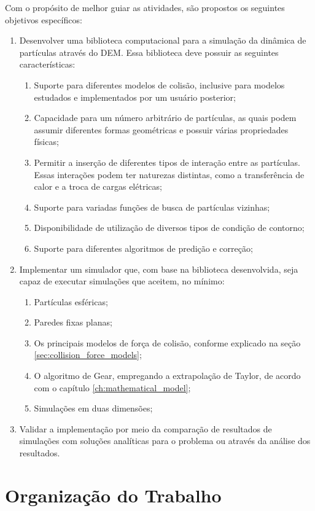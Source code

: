 Com o propósito de melhor guiar as atividades, são propostos os seguintes objetivos específicos:
\begin{enumerate}
\item Desenvolver uma biblioteca computacional para a simulação da dinâmica de partículas através do DEM. Essa biblioteca deve possuir as seguintes características: \label{item:library}
 	\begin{enumerate}
		\item Suporte para diferentes modelos de colisão, inclusive para modelos estudados e implementados por um usuário posterior;
		\item Capacidade para um número arbitrário de partículas, as quais podem assumir diferentes formas geométricas e possuir várias propriedades físicas;
        \item Permitir a inserção de diferentes tipos de interação entre as partículas. Essas interações podem ter naturezas distintas, como a transferência de calor e a troca de cargas elétricas;
		\item Suporte para variadas funções de busca de partículas vizinhas;
		\item Disponibilidade de utilização de diversos tipos de condição de contorno;
		\item Suporte para diferentes algoritmos de predição e correção;
	\end{enumerate}  
\item Implementar um simulador que, com base na biblioteca desenvolvida, seja capaz de executar simulações que aceitem, no mínimo:
	\begin{enumerate}
		\item Partículas esféricas;
		\item Paredes fixas planas;
		\item Os principais modelos de força de colisão, conforme explicado na seção \ref{sec:collision_force_models};
		\item O algoritmo de Gear, empregando a extrapolação de Taylor, de acordo com o capítulo \ref{ch:mathematical_model};
		\item Simulações em duas dimensões;
	\end{enumerate}
\item Validar a implementação por meio da comparação de resultados de simulações com soluções analíticas para o problema ou através da análise dos resultados.
\end{enumerate}

\section{Organização do Trabalho}

